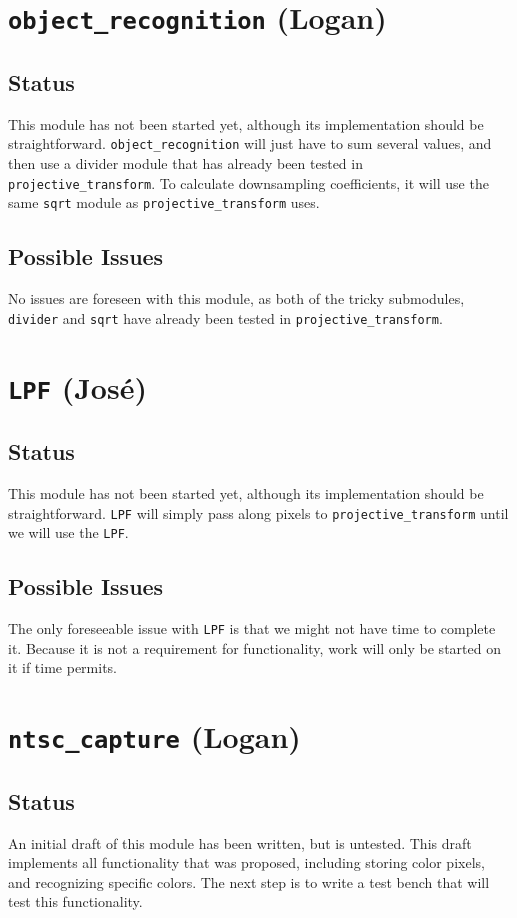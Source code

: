 \documentclass{article}
\begin{document}
\section{{\tt object\_recognition} (Logan)}
\subsection{Status} This module has not been started yet, although its implementation should be straightforward. {\tt object\_recognition} will just have to sum several values, and then use a divider module that has already been tested in {\tt projective\_transform}. To calculate downsampling coefficients, it will use the same {\tt sqrt} module as {\tt projective\_transform} uses.
\subsection{Possible Issues} No issues are foreseen with this module, as both of the tricky submodules, {\tt divider} and {\tt sqrt} have already been tested in {\tt projective\_transform}.

\section{{\tt LPF} (Jos\'{e})}
\subsection{Status} This module has not been started yet, although its implementation should be straightforward. {\tt LPF} will simply pass along pixels to {\tt projective\_transform} until we will use the {\tt LPF}.
\subsection{Possible Issues} The only foreseeable issue with {\tt LPF} is that we might not have time to complete it. Because it is not a requirement for functionality, work will only be started on it if time permits.

\section{{\tt ntsc\_capture} (Logan)}
\subsection{Status} An initial draft of this module has been written, but is untested. This draft implements all functionality that was proposed, including storing color pixels, and recognizing specific colors. The next step is to write a test bench that will test this functionality.
\end{document}
